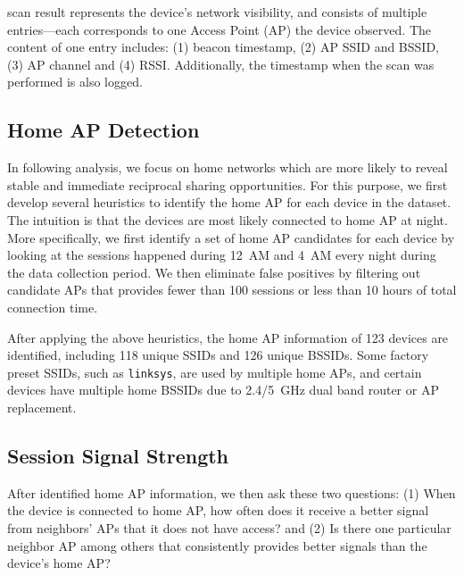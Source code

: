 \wifi{} scan result represents the device's network visibility, and consists of
multiple entries---each corresponds to one \wifi{} Access Point (AP) the device
observed. The content of one entry includes: (1) beacon timestamp, (2) AP SSID
and BSSID, (3) AP channel and (4) RSSI. Additionally, the timestamp when the
scan was performed is also logged.

\subsection{Home AP Detection}
\label{subsec:homeap}

In following analysis, we focus on home \wifi{} networks which are more likely
to reveal stable and immediate reciprocal sharing opportunities. For this
purpose, we first develop several heuristics to identify the home AP for each
device in the dataset. The intuition is that the devices are most likely
connected to home AP at night. More specifically, we first identify a set of
home AP candidates for each device by looking at the \wifi{} sessions happened
during 12~AM and 4~AM every night during the data collection period. We then
eliminate false positives by filtering out candidate APs that provides fewer
than 100 sessions or less than 10 hours of total connection time.

After applying the above heuristics, the home AP information of 123 devices are
identified, including 118 unique SSIDs and 126 unique BSSIDs. Some factory
preset SSIDs, such as \texttt{linksys}, are used by multiple home APs, and
certain devices have multiple home BSSIDs due to 2.4/5~GHz dual band router or
AP replacement.

\subsection{\wifi{} Session Signal Strength}
\label{subsec:better}

After identified home AP information, we then ask these two questions: (1) When
the device is connected to home AP, how often does it receive a better signal
from neighbors' APs that it does not have access? and (2) Is there one
particular neighbor AP among others that consistently provides better signals
than the device's home AP?

